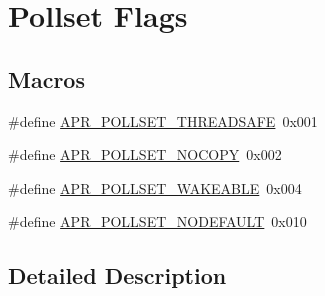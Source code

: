 \hypertarget{group__pollflags}{\section{Pollset Flags}
\label{group__pollflags}
}
\subsection*{Macros}
\begin{DoxyCompactItemize}
\item 
\#define \hyperlink{group__pollflags_gabdfaccfd394c847f692351dee2e5ef7f}{A\-P\-R\-\_\-\-P\-O\-L\-L\-S\-E\-T\-\_\-\-T\-H\-R\-E\-A\-D\-S\-A\-F\-E}~0x001
\item 
\#define \hyperlink{group__pollflags_ga0febaf4378d2705bf1256b22fe8dfd24}{A\-P\-R\-\_\-\-P\-O\-L\-L\-S\-E\-T\-\_\-\-N\-O\-C\-O\-P\-Y}~0x002
\item 
\#define \hyperlink{group__pollflags_ga552d7f28d442602e6c9bb6931f183493}{A\-P\-R\-\_\-\-P\-O\-L\-L\-S\-E\-T\-\_\-\-W\-A\-K\-E\-A\-B\-L\-E}~0x004
\item 
\#define \hyperlink{group__pollflags_gaa46a9cbb23b2e8e71dd3ba88e69fdf13}{A\-P\-R\-\_\-\-P\-O\-L\-L\-S\-E\-T\-\_\-\-N\-O\-D\-E\-F\-A\-U\-L\-T}~0x010
\end{DoxyCompactItemize}


\subsection{Detailed Description}



